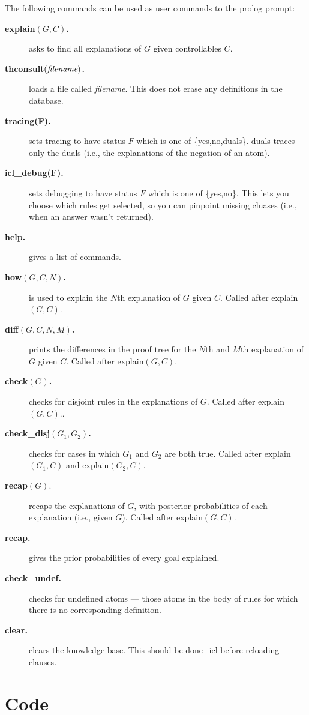 \documentclass[11pt,fleqn]{article}
\newcommand{\btt}{\ttfamily\bfseries}
\begin{document}
The following commands can be used as
user commands to the prolog prompt:
\begin{description}
\item[{\btt explain$(G,C)$.}] asks to find all explanations of $G$
given controllables $C$.
\item[{\btt thconsult$(\hbox{\em filename})$.}] loads a file called
{\em filename}. This does not erase any definitions in the database.
\item[{\btt tracing(F).}] sets tracing to have status $F$ which is
one of {\ttfamily \{yes,no,duals\}}. {\ttfamily duals} traces only the
duals (i.e., the explanations of the negation of an atom).
\item[{\btt icl_debug(F).}] sets debugging to have status $F$ which is
one of {\ttfamily \{yes,no\}}. This lets you choose which rules get
selected, so you can pinpoint missing cluases (i.e., when an answer
wasn't returned).
\item[{\btt help.}] gives a list of commands.
\item[{\btt how$(G,C,N)$.}]
is used to explain the $N$th explanation of $G$ given $C$. Called
after {\ttfamily explain$(G,C)$.}
\item[{\btt diff$(G,C,N,M)$.}] 
prints the differences in the proof tree for the $N$th and $M$th
explanation of $G$ given $C$. Called after {\ttfamily explain$(G,C)$}.
\item[{\btt check$(G)$.}] 
checks for disjoint rules in the explanations of $G$.
 Called after {\ttfamily explain$(G,C)$.}.
\item[{\btt check\_disj$(G_1,G_2)$.}] 
checks for cases in which $G_1$ and $G_2$ are both true.
 Called after {\ttfamily explain$(G_1,C)$} and {\ttfamily explain$(G_2,C)$}.
\item[{\btt recap$(G).$}] 
recaps the explanations of $G$, with posterior probabilities of each
 explanation (i.e., given $G$). 
 Called after {\ttfamily explain$(G,C)$}.
\item[{\btt recap.}] 
gives the prior probabilities of every goal explained.
\item[{\btt check\_undef.}] checks for undefined atoms --- those atoms
in the body of rules for which there is no corresponding definition.
\item[{\btt clear.}] clears the knowledge base. This should be done_icl before reloading clauses.
\end{description}

\section{Code}
\end{document}
